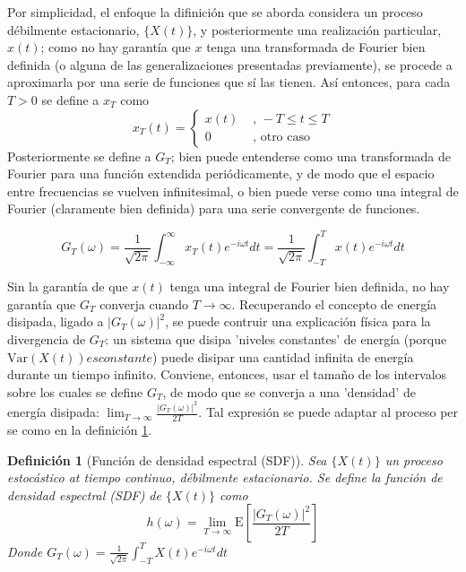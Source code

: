 \documentclass[12pt,a4paper]{mitthesis}
\newtheorem{defn}{Definici\'on}
\newcommand{\intR}{\int_{-\infty}^{\infty}}
\newcommand{\E}[1]{\mathrm{E}\left[ #1 \right]}
\newcommand{\Var}[1]{\mathrm{Var}\left( #1 \right)}
\begin{document}
Por simplicidad, el enfoque la difinici\'on que se aborda considera un proceso d\'ebilmente 
estacionario, $\{X(t)\}$, y posteriormente una realizaci\'on particular, $x(t)$; como no hay 
garant\'ia que $x$ tenga una transformada de Fourier bien definida (o alguna de las 
generalizaciones presentadas previamente), se procede a aproximarla por una serie de funciones que 
s\'i las tienen.
As\'i entonces, para cada $T>0$ se define a $x_T$ como
\begin{equation*}
x_T(t) = 
\begin{cases}
x(t) & \text{ , } -T\leq t \leq T \\
0 & \text{ , otro caso}
\end{cases}
\end{equation*}
Posteriormente se define a $G_T$; bien puede entenderse como una transformada de Fourier para una 
funci\'on extendida peri\'odicamente, y de modo que el espacio entre frecuencias se vuelven 
infinitesimal, o bien puede verse como una integral de Fourier (claramente bien definida) para una 
serie convergente de funciones.

\begin{equation*}
G_T (\omega) = \frac{1}{\sqrt{2 \pi}} \intR x_T(t) e^{-i \omega t} dt
= \frac{1}{\sqrt{2 \pi}} \int_{-T}^{T} x(t) e^{-i \omega t} dt
\end{equation*}

Sin la garant\'ia de que $x(t)$ tenga una integral de Fourier bien definida, no hay garant\'ia 
que $G_T$ converja cuando $T\rightarrow \infty$. Recuperando el concepto de energ\'ia disipada, 
ligado a $\left| G_T(\omega) \right|^{2}$, se puede contruir una explicaci\'on f\'isica para la 
divergencia de $G_T$: un sistema que disipa 'niveles constantes' de energ\'ia (porque 
$\Var{X(t)} es constante$) puede disipar una cantidad infinita de energ\'ia durante un tiempo 
infinito. 
Conviene, entonces, usar el tama\~no de los intervalos sobre los cuales se define $G_T$, de modo 
que se converja a una 'densidad' de energ\'ia disipada:
$\lim_{T\rightarrow{\infty}} \frac{ \left| G_T(\omega) \right|^{2}}{2 T}$.
Tal expresi\'on se puede adaptar al proceso per se como en la definici\'on \ref{SDF}.

\begin{defn}[Funci\'on de densidad espectral (SDF)]
Sea $\{X(t)\}$ un proceso estoc\'astico at tiempo continuo, d\'ebilmente estacionario. Se define la 
funci\'on de densidad espectral (SDF) de $\{X(t)\}$ como
\begin{equation*}
h(\omega) = \lim_{T\rightarrow \infty} \E{ \frac{ \left| G_T(\omega) \right|^{2}}{2 T} }
\end{equation*}
Donde $G_T (\omega) = \frac{1}{\sqrt{2 \pi}} \int_{-T}^{T} X(t) e^{-i \omega t} dt$
\label{SDF}
\end{defn}
\end{document}
